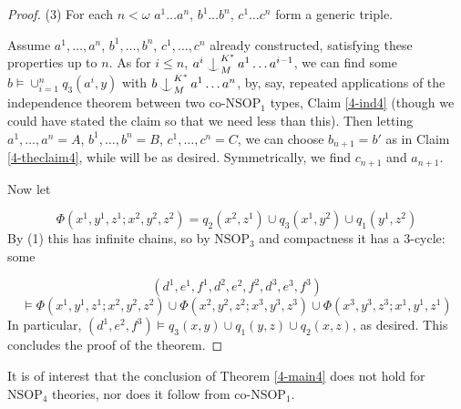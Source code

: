 \documentclass[12pt]{amsart}
\theoremstyle{definition}
\def\Ind#1#2{#1\setbox0=\hbox{$#1x$}\kern\wd0\hbox to 0pt{\hss$#1\mid$\hss}
\lower.9\ht0\hbox to 0pt{\hss$#1\smile$\hss}\kern\wd0}
\def\ind{\mathop{\mathpalette\Ind{}}}
\begin{document}
\begin{proof}
(3) For each $n< \omega$ $a^{1} \ldots a^{n}$, $b^{1} \ldots b^{n}$, $c^{1} \ldots c^{n}$ form a generic triple.

Assume $a^{1}, \ldots, a^{n}$, $b^{1}, \ldots, b^{n}$, $c^{1}, \ldots, c^{n}$ already constructed, satisfying these properties up to $n$. As for $i \leq n$, $a^{i} \ind^{K^{*}}_{M} a^{1} \ldots a^{i-1}$, we can find some $b \models \cup^{n}_{i=1} q_{3}(a^{i}, y)$ with $b \ind_{M}^{K^{*}} a^{1} \ldots a^{n}$, by, say, repeated applications of the independence theorem between two co-$\mathrm{NSOP}_{1}$ types, Claim \ref{4-ind4} (though we could have stated the claim so that we need less than this). Then letting $a^{1}, \ldots, a^{n}=A$, $b^{1}, \ldots, b^{n}=B$, $c^{1}, \ldots, c^{n}=C$, we can choose $b_{n+1}=b'$ as in Claim \ref{4-theclaim4}, while will be as desired. Symmetrically, we find $c_{n+1}$ and $a_{n+1}$.

Now let 

$$\Phi(x^{1}, y^{1}, z^{1}; x^{2}, y^{2}, z^{2}) = q_{2}(x^{2}, z^{1}) \cup q_{3}(x^{1},y^{2}) \cup q_{1}(y^{1}, z^{2})$$ By (1) this has infinite chains, so by $\mathrm{NSOP}_{3}$ and compactness it has a $3$-cycle: some 

$$(d^{1}, e^{1}, f^{1}, d^{2}, e^{2}, f^{2}, d^{3}, e^{3}, f^{3})$$ $$\models \Phi(x^{1}, y^{1}, z^{1}; x^{2}, y^{2}, z^{2}) \cup \Phi(x^{2}, y^{2}, z^{2}; x^{3}, y^{3}, z^{3}) \cup \Phi(x^{3}, y^{3}, z^{3}; x^{1}, y^{1}, z^{1})$$ In particular, $(d^{1}, e^{2}, f^{3}) \models q_{3}(x,y) \cup q_{1}(y, z) \cup q_{2}(x, z)$, as desired. This concludes the proof of the theorem. \end{proof}

It is of interest that the conclusion of Theorem \ref{4-main4} does not hold for $\mathrm{NSOP}_{4}$ theories, nor does it follow from co-$\mathrm{NSOP}_{1}$.
\end{document}
